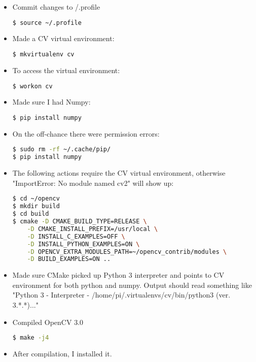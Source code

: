 \documentclass[journal, a4paper]{IEEEtran}
\begin{document}
\begin{itemize}
\begin{itemize}
\begin{itemize}
\begin{lstlisting}[language=bash]
			\end{lstlisting}
            \item Commit changes to \texttildelow /.profile
            \begin{lstlisting}[language=bash]
$ source ~/.profile
			\end{lstlisting}
            \item Made a CV virtual environment:
            \begin{lstlisting}[language=bash]
$ mkvirtualenv cv
			\end{lstlisting}
            \item To access the virtual environment:
            \begin{lstlisting}[language=bash]
$ workon cv
			\end{lstlisting}
            \item Made sure I had Numpy:
            \begin{lstlisting}[language=bash]
$ pip install numpy
			\end{lstlisting}
            \item On the off-chance there were permission errors:
            \begin{lstlisting}[language=bash]
$ sudo rm -rf ~/.cache/pip/
$ pip install numpy
			\end{lstlisting}
            \item The following actions require the CV virtual environment, otherwise "ImportError: No module named cv2" will show up:
            \begin{lstlisting}[language=bash]
$ cd ~/opencv
$ mkdir build
$ cd build
$ cmake -D CMAKE_BUILD_TYPE=RELEASE \
	-D CMAKE_INSTALL_PREFIX=/usr/local \
	-D INSTALL_C_EXAMPLES=OFF \
	-D INSTALL_PYTHON_EXAMPLES=ON \
	-D OPENCV_EXTRA_MODULES_PATH=~/opencv_contrib/modules \
	-D BUILD_EXAMPLES=ON ..
			\end{lstlisting}
            \item Made sure CMake picked up Python 3 interpreter and points to CV environment for both python and numpy. Output should read something like "Python 3 - Interpreter - /home/pi/.virtualenvs/cv/bin/python3 (ver. 3.*.*)..."
            \item Compiled OpenCV 3.0
            \begin{lstlisting}[language=bash]
$ make -j4
			\end{lstlisting}
            \item After compilation, I installed it.
            \begin{lstlisting}[language=bash]

\end{lstlisting}
\end{itemize}
\end{itemize}
\end{itemize}
\end{document}
